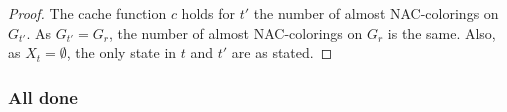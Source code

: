 \subsubsection*{\RootNode{}}

%
%
\begin{proof}
	The cache function \( c \) holds for \( t' \) the number of almost NAC-colorings on \( G_{t'} \).
	As \( G_{t'} = G_r \), the number of almost NAC-colorings on \( G_r \) is the same.
	Also, as \( X_t = \emptyset \), the only state in \( t \) and \( t' \) are as stated.
\end{proof}
%

\subsubsection*{All done}

